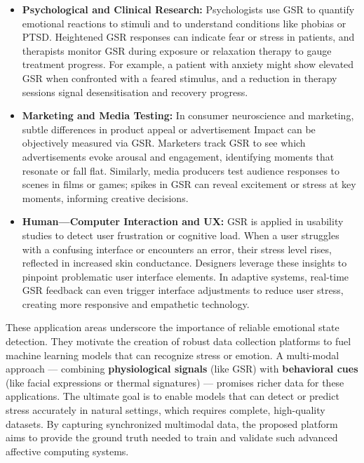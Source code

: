\documentclass[11pt,a4paper]{report}
\begin{document}
\begin{itemize}
\item \textbf{Psychological and Clinical Research:} Psychologists use GSR to
  quantify emotional reactions to stimuli and to understand conditions
  like phobias or PTSD. Heightened GSR responses can indicate fear or
  stress in patients, and therapists monitor GSR during exposure or
  relaxation therapy to gauge treatment
  progress\cite{AppleHealthWatch2019}\cite{SamsungHealth2020}.
  For example, a patient with anxiety might show elevated GSR when
  confronted with a feared stimulus, and a reduction in therapy
  sessions signal desensitisation and recovery progress.
\item \textbf{Marketing and Media Testing:} In consumer neuroscience and
  marketing, subtle differences in product appeal or advertisement
  Impact can be objectively measured via GSR. Marketers track GSR to see
  which advertisements evoke arousal and engagement, identifying moments
  that resonate or fall
  flat\cite{Fowles1981}\cite{Healey2005}.
  Similarly, media producers test audience responses to scenes in films
  or games; spikes in GSR can reveal excitement or stress at key
  moments, informing creative decisions.
\item \textbf{Human---Computer Interaction and UX:} GSR is applied in usability
  studies to detect user frustration or cognitive load. When a user
  struggles with a confusing interface or encounters an error, their
  stress level rises, reflected in increased skin
  conductance\cite{Picard2001}.
  Designers leverage these insights to pinpoint problematic user
  interface elements. In adaptive systems, real-time GSR feedback can
  even trigger interface adjustments to reduce user stress, creating
  more responsive and empathetic technology.

\end{itemize}
These application areas underscore the importance of reliable emotional
state detection. They motivate the creation of robust data collection
platforms to fuel machine learning models that can recognize stress or
emotion. A multi-modal approach --- combining \textbf{physiological signals}
(like GSR) with \textbf{behavioral cues} (like facial expressions or thermal
signatures) --- promises richer data for these applications. The ultimate
goal is to enable models that can detect or predict stress accurately in
natural settings, which requires complete, high-quality datasets.
By capturing synchronized multimodal data, the proposed platform aims to
provide the ground truth needed to train and validate such advanced
affective computing systems.
\end{document}
